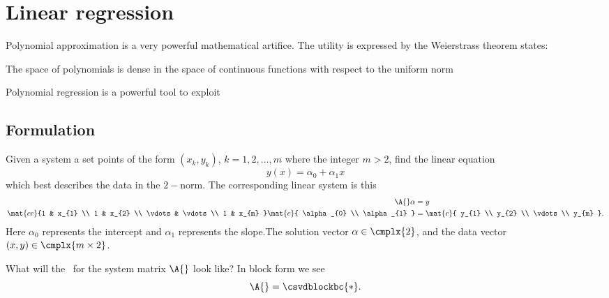 \section{Linear regression}

Polynomial approximation is a very powerful mathematical artifice. The utility is expressed by the
Weierstrass theorem states:
\begin{myTheorem}
The space of polynomials is dense in the space of continuous functions with respect to the uniform norm
\end{myTheorem}

Polynomial regression is a powerful tool to exploit

\subsection{Formulation}
Given a system a set points of the form $(x_{k}, y_{k})$, $k=1,2,\dots,m$ where the integer $m>2$, find the linear equation
  \begin{equation}
    y(x) = \alpha_{0} + \alpha_{1}x
  \end{equation}
which best describes the data in the $2-$norm. The corresponding linear system is this
\begin{equation}
  \begin{split}
    \A{} \alpha &= y \\
    \mat{cc}{1 & x_{1}  \\ 1 & x_{2} \\ \vdots & \vdots \\ 1 & x_{m} }
    \mat{c}{ \alpha_{0} \\ \alpha_{1} } &=
    \mat{c}{ y_{1} \\ y_{2} \\ \vdots \\ y_{m} } .
  \label{eq:linear model}
  \end{split}
\end{equation}
Here $\alpha_{0}$ represents the intercept and $\alpha_{1}$ represents the slope.The solution vector $\alpha\in\cmplx{2}$, and the data vector $(x,y)\in\cmplx{m\times 2}$. 

What will the \asvd \ for the system matrix $\A{}$ look like? In block form we see
  \begin{equation}
    \A{} = \csvdblockbc{*} .
  \end{equation}



